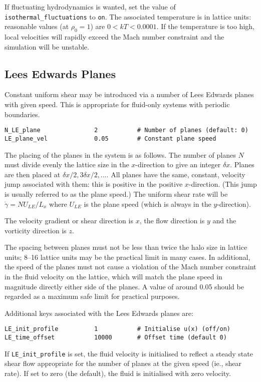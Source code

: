 If fluctuating hydrodynamics is wanted, set the value of
 \texttt{isothermal\_fluctuations} to \texttt{on}. The associated
temperature is in lattice units: reasonable values (at $\rho_0 = 1$)
are $0 < kT < 0.0001$. If the temperature is too high, local
velocities will rapidly exceed the Mach number constraint and
the simulation will be unstable.

\subsection{Lees Edwards Planes}

Constant uniform shear may be introduced via a number of Lees Edwards
planes with given speed. This is appropriate for fluid-only
systems with periodic boundaries.
\begin{lstlisting}
N_LE_plane               2           # Number of planes (default: 0)
LE_plane_vel             0.05        # Constant plane speed
\end{lstlisting}
The placing of the planes in the system is as follows.
The number of planes $N$ must
divide evenly the lattice size in the $x$-direction to give an integer
$\delta x$. Planes are then placed at $\delta x / 2, 3\delta x/2, \ldots$.
All planes have the same, constant, velocity jump associated with them:
this is positive in the positive $x$-direction. (This jump is usually
referred to as the plane speed.) The uniform shear rate
will be $\dot{\gamma} = N U_{LE} / L_x$ where $U_{LE}$ is the plane
speed (which is always in the $y$-direction).

The velocity gradient or shear direction is $x$, the flow
direction is $y$ and the vorticity direction is $z$.

The spacing between planes must not be less than twice the halo size
in lattice units; 8--16 lattice units may be the practical limit in
many cases. In additional, the speed of the planes must not cause a
violation of the
Mach number constraint in the fluid velocity on the lattice, which
will match the plane speed in magnitude directly either side of the
planes. A value of around 0.05 should be regarded as a maximum safe
limit for practical purposes.

Additional keys associated with the Lees Edwards planes are:
\begin{lstlisting}
LE_init_profile          1           # Initialise u(x) (off/on)
LE_time_offset           10000       # Offset time (default 0)
\end{lstlisting}
If \texttt{LE\_init\_profile} is set, the fluid velocity is initialised
to reflect a steady state shear flow appropriate for the number of
planes at the given speed (ie., shear rate). If set to zero (the default),
the fluid is initialised with zero velocity.

